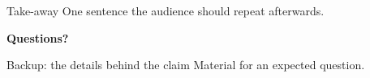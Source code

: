 \documentclass[aspectratio=169]{beamer}
\begin{document}
\begin{frame}
  \begin{block}{Take-away}
    \Large One sentence the audience should repeat afterwards.
  \end{block}
\end{frame}

\begin{frame}[allowframebreaks]
  \printbibliography
\end{frame}

{
\begin{frame}[plain]
  \centering\vfill\huge
  \textcolor{CtpBase}{\textbf{Questions?}}
  \vfill
\end{frame}
}

\appendix

\begin{frame}[label=backup-details]{Backup: the details behind the claim}
  Material for an expected question.
  \vfill\hfill\hyperlink{claim}{}
\end{frame}

\begin{frame}
  \null
\end{frame}
\end{document}
